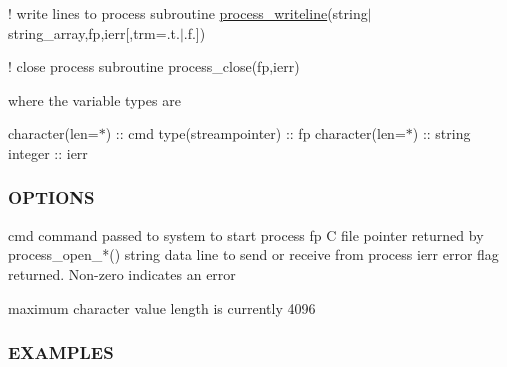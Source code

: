 ! write lines to process subroutine \hyperlink{interfacem__process_1_1process__writeline}{process\+\_\+writeline}(string$\vert$string\+\_\+array,fp,ierr\mbox{[},trm=.t.$\vert$.f.\mbox{]})

! close process subroutine process\+\_\+close(fp,ierr)

where the variable types are

character(len=$\ast$) \+:\+: cmd type(streampointer) \+:\+: fp character(len=$\ast$) \+:\+: string integer \+:\+: ierr

\subsubsection*{O\+P\+T\+I\+O\+NS}

\begin{DoxyVerb}cmd          command passed to system to start process
fp           C file pointer returned by process_open_*()
string       data line to send or receive from process
ierr         error flag returned. Non-zero indicates an error

maximum character value length is currently 4096
\end{DoxyVerb}


\subsubsection*{E\+X\+A\+M\+P\+L\+ES}

